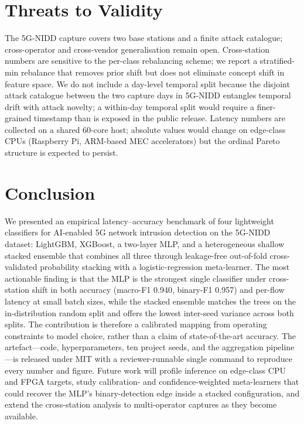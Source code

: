 \documentclass[conference]{IEEEtran}
\begin{document}
\section{Threats to Validity}
\label{sec:threats}

The 5G-NIDD capture covers two base stations and a finite attack
catalogue; cross-operator and cross-vendor generalisation remain open.
Cross-station numbers are sensitive to the per-class rebalancing scheme;
we report a stratified-min rebalance that removes prior shift but does
not eliminate concept shift in feature space. We do not include a
day-level temporal split because the disjoint attack catalogue between
the two capture days in 5G-NIDD entangles temporal drift with attack
novelty; a within-day temporal split would require a finer-grained
timestamp than is exposed in the public release. Latency numbers are
collected on a shared 60-core host; absolute values would change on
edge-class CPUs (Raspberry Pi, ARM-based MEC accelerators) but the
ordinal Pareto structure is expected to persist.

\section{Conclusion}
\label{sec:conclusion}

We presented an empirical latency--accuracy benchmark of four
lightweight classifiers for AI-enabled 5G network intrusion detection
on the 5G-NIDD dataset: LightGBM, XGBoost, a two-layer MLP, and a
heterogeneous shallow stacked ensemble that combines all three through
leakage-free out-of-fold cross-validated probability stacking with a
logistic-regression meta-learner. The most actionable finding is that
the MLP is the strongest single classifier under cross-station shift in
both accuracy (macro-F1 0.940, binary-F1 0.957) and per-flow latency at
small batch sizes, while the stacked ensemble matches the trees on the
in-distribution random split and offers the lowest inter-seed variance
across both splits. The contribution is therefore a calibrated mapping
from operating constraints to model choice, rather than a claim of
state-of-the-art accuracy. The artefact---code, hyperparameters, ten
project seeds, and the aggregation pipeline---is released under MIT
with a reviewer-runnable single command to reproduce every number and
figure. Future work will profile inference on edge-class CPU and FPGA
targets, study calibration- and confidence-weighted meta-learners that
could recover the MLP's binary-detection edge inside a stacked
configuration, and extend the cross-station analysis to multi-operator
captures as they become available.
\end{document}

